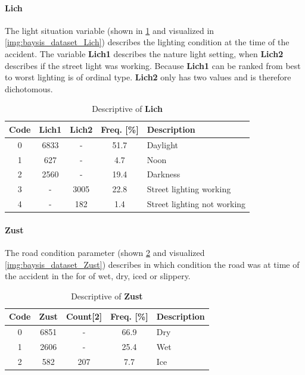 \paragraph{Lich}
\label{baysis_dataset_Lich}
The light situation variable (shown in \cref{tbl:baysis_dataset_Lich} and visualized in \cref{img:baysis_dataset_Lich}) describes the lighting condition at the time of the accident. The variable \textbf{Lich1} describes the nature light setting, when \textbf{Lich2} describes if the street light was working. Because \textbf{Lich1} can be ranked from best to worst lighting is of ordinal type. \textbf{Lich2} only has two values and is therefore dichotomous.
\begin{table}[ht]
	\centering
	\small
	\begin{tabular}{c|c|c|c|l}
		\toprule
		Code & \textbf{Lich1} & \textbf{Lich2} & Freq. [\%] & Description \\ 
		\midrule 
		0 & 6833 	& - 	& 51.7 & Daylight \\
		1 & 627 	& -		& 4.7  & Noon \\
		2 & 2560	& - 	& 19.4 & Darkness \\
		3 & - 		& 3005	& 22.8 & Street lighting working \\
		4 & - 		& 182	& 1.4  & Street lighting not working \\
		\bottomrule
	\end{tabular}
	\caption{Descriptive of \textbf{Lich}}
	\label{tbl:baysis_dataset_Lich}
	\vspace{-8mm}
\end{table} 

\paragraph{Zust}
\label{baysis_dataset_Zust}
The road condition parameter (shown \cref{tbl:baysis_dataset_Zust} and visualized \cref{img:baysis_dataset_Zust}) describes in which condition the road was at time of the accident in the for of wet, dry, iced or slippery.
\begin{table}[ht]
	\centering
	\small
	\begin{tabular}{c|c|c|c|l}
		\toprule
		Code & \textbf{Zust} & Count[2] & Freq. [\%] & Description \\ 
		\midrule 
		0 & 6851 	& -		& 66.9 & Dry \\ 
 		1 & 2606	& -		& 25.4 & Wet \\ 
 		2 & 582		& 207	& 7.7  & Ice \\
	\end{tabular}
	\caption{Descriptive of \textbf{Zust}}
	\label{tbl:baysis_dataset_Zust}
	\vspace{-8mm}
\end{table}

